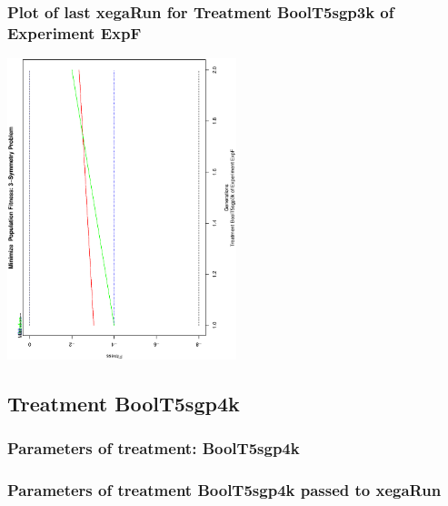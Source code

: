 \documentclass[18pt,c]{beamer}
\begin{document}
 \begin{frame}
 \frametitle{ Plot of last xegaRun for Treatment BoolT5sgp3k of Experiment ExpF }
 \begin{center}
\includegraphics[width=0.5\textwidth, angle=-90]
{ExpFPlotPopStatsFigure004.eps}
 \end{center}
 \label{report/ExpFPlotPopStatsFigure004.eps}  
 \end{frame}

\clearpage
\subsection{Treatment BoolT5sgp4k}

 \begin{frame}
 \fontsize{8pt}{9pt}\selectfont
 \frametitle{  Parameters of treatment: BoolT5sgp4k 
 }

 \label{ExpFtParmTable020.tex}  
 \end{frame}


 \begin{frame}
 \fontsize{8pt}{9pt}\selectfont
 \frametitle{  Parameters of treatment BoolT5sgp4k passed to xegaRun
 }

 \label{ExpFtParmTable021.tex}  
 \end{frame}
\end{document}
